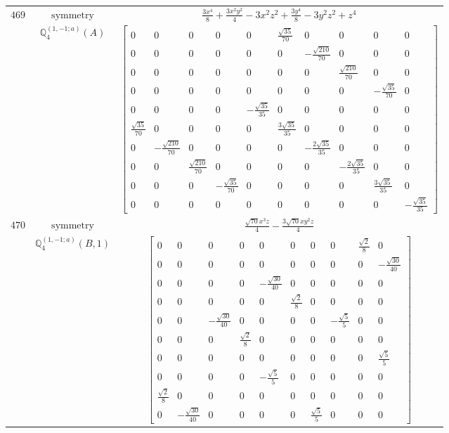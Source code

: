 \documentclass[fleqn,8pt,landscape]{jsarticle}
\begin{document}
\begin{longtable}{ccc}
$ 469 $ & $ \text{symmetry} $ & $ \frac{3 x^{4}}{8} + \frac{3 x^{2} y^{2}}{4} - 3 x^{2} z^{2} + \frac{3 y^{4}}{8} - 3 y^{2} z^{2} + z^{4} $ \\
$  $ & $ \mathbb{Q}_{4}^{(1,-1;a)}(A) $ & $ \begin{bmatrix} 0 & 0 & 0 & 0 & 0 & \frac{\sqrt{35}}{70} & 0 & 0 & 0 & 0 \\ 0 & 0 & 0 & 0 & 0 & 0 & - \frac{\sqrt{210}}{70} & 0 & 0 & 0 \\ 0 & 0 & 0 & 0 & 0 & 0 & 0 & \frac{\sqrt{210}}{70} & 0 & 0 \\ 0 & 0 & 0 & 0 & 0 & 0 & 0 & 0 & - \frac{\sqrt{35}}{70} & 0 \\ 0 & 0 & 0 & 0 & - \frac{\sqrt{35}}{35} & 0 & 0 & 0 & 0 & 0 \\ \frac{\sqrt{35}}{70} & 0 & 0 & 0 & 0 & \frac{3 \sqrt{35}}{35} & 0 & 0 & 0 & 0 \\ 0 & - \frac{\sqrt{210}}{70} & 0 & 0 & 0 & 0 & - \frac{2 \sqrt{35}}{35} & 0 & 0 & 0 \\ 0 & 0 & \frac{\sqrt{210}}{70} & 0 & 0 & 0 & 0 & - \frac{2 \sqrt{35}}{35} & 0 & 0 \\ 0 & 0 & 0 & - \frac{\sqrt{35}}{70} & 0 & 0 & 0 & 0 & \frac{3 \sqrt{35}}{35} & 0 \\ 0 & 0 & 0 & 0 & 0 & 0 & 0 & 0 & 0 & - \frac{\sqrt{35}}{35} \end{bmatrix} $ \\ \hline
$ 470 $ & $ \text{symmetry} $ & $ \frac{\sqrt{70} x^{3} z}{4} - \frac{3 \sqrt{70} x y^{2} z}{4} $ \\
$  $ & $ \mathbb{Q}_{4}^{(1,-1;a)}(B,1) $ & $ \begin{bmatrix} 0 & 0 & 0 & 0 & 0 & 0 & 0 & 0 & \frac{\sqrt{2}}{8} & 0 \\ 0 & 0 & 0 & 0 & 0 & 0 & 0 & 0 & 0 & - \frac{\sqrt{30}}{40} \\ 0 & 0 & 0 & 0 & - \frac{\sqrt{30}}{40} & 0 & 0 & 0 & 0 & 0 \\ 0 & 0 & 0 & 0 & 0 & \frac{\sqrt{2}}{8} & 0 & 0 & 0 & 0 \\ 0 & 0 & - \frac{\sqrt{30}}{40} & 0 & 0 & 0 & 0 & - \frac{\sqrt{5}}{5} & 0 & 0 \\ 0 & 0 & 0 & \frac{\sqrt{2}}{8} & 0 & 0 & 0 & 0 & 0 & 0 \\ 0 & 0 & 0 & 0 & 0 & 0 & 0 & 0 & 0 & \frac{\sqrt{5}}{5} \\ 0 & 0 & 0 & 0 & - \frac{\sqrt{5}}{5} & 0 & 0 & 0 & 0 & 0 \\ \frac{\sqrt{2}}{8} & 0 & 0 & 0 & 0 & 0 & 0 & 0 & 0 & 0 \\ 0 & - \frac{\sqrt{30}}{40} & 0 & 0 & 0 & 0 & \frac{\sqrt{5}}{5} & 0 & 0 & 0 \end{bmatrix} $ \\ \hline

\end{longtable}
\end{document}
